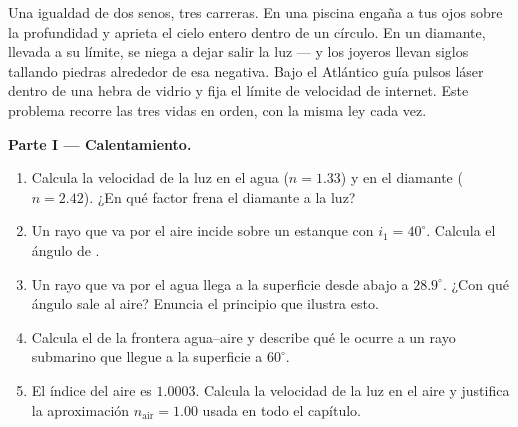 \begin{problem}
\label{pb:g10:refraction:1}
Una igualdad de dos senos, tres carreras. En una piscina engaña a tus
ojos sobre la profundidad y aprieta el cielo entero dentro de un
círculo. En un diamante, llevada a su límite, se niega a dejar salir la
luz --- y los joyeros llevan siglos tallando piedras alrededor de esa
negativa. Bajo el Atlántico guía pulsos láser dentro de una hebra de
vidrio y fija el límite de velocidad de internet. Este problema recorre
las tres vidas en orden, con la misma ley cada vez.

\medskip
\noindent\textbf{Parte I --- Calentamiento.}
\begin{enumerate}
  \item Calcula la velocidad de la luz en el agua ($n = 1.33$) y en el
        diamante ($n = 2.42$). ¿En qué factor frena el diamante a la
        luz?
  \item Un rayo que va por el aire incide sobre un estanque con
        $i_1 = 40^\circ$. Calcula el ángulo de .
  \item Un rayo que va por el agua llega a la superficie desde abajo a
        $28.9^\circ$. ¿Con qué ángulo sale al aire? Enuncia el principio
        que ilustra esto.
  \item Calcula el  de la frontera agua--aire y describe
        qué le ocurre a un rayo submarino que llegue a la superficie a
        $60^\circ$.
  \item El índice del aire es $1.0003$. Calcula la velocidad de la luz
        en el aire y justifica la aproximación $n_{\text{air}} = 1.00$
        usada en todo el capítulo.
\end{enumerate}


\end{problem}
